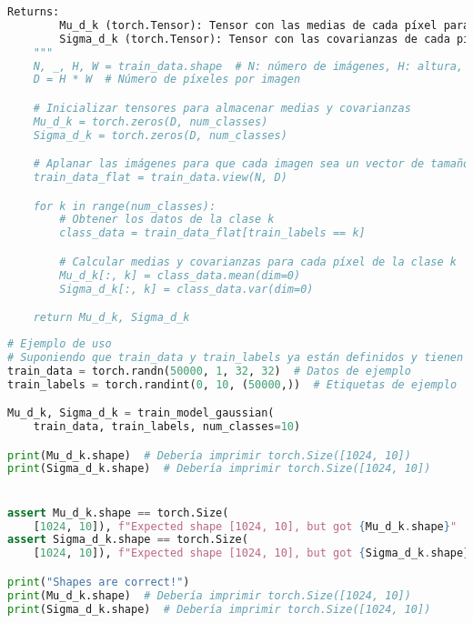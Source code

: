 \documentclass[spanish]{article}
\begin{document}
\begin{enumerate}
\begin{enumerate}
\begin{lstlisting}[language=Python, caption=Implementacion Modelo Gaussiano]
    Returns:
        Mu_d_k (torch.Tensor): Tensor con las medias de cada píxel para cada clase de forma [D, K].
        Sigma_d_k (torch.Tensor): Tensor con las covarianzas de cada píxel para cada clase de forma [D, K].
    """
    N, _, H, W = train_data.shape  # N: número de imágenes, H: altura, W: anchura
    D = H * W  # Número de píxeles por imagen

    # Inicializar tensores para almacenar medias y covarianzas
    Mu_d_k = torch.zeros(D, num_classes)
    Sigma_d_k = torch.zeros(D, num_classes)

    # Aplanar las imágenes para que cada imagen sea un vector de tamaño D
    train_data_flat = train_data.view(N, D)

    for k in range(num_classes):
        # Obtener los datos de la clase k
        class_data = train_data_flat[train_labels == k]

        # Calcular medias y covarianzas para cada píxel de la clase k
        Mu_d_k[:, k] = class_data.mean(dim=0)
        Sigma_d_k[:, k] = class_data.var(dim=0)

    return Mu_d_k, Sigma_d_k
\end{lstlisting}

\begin{lstlisting}[language=Python, caption=Pruebas Unitarias Modelo Gaussiano]
# Ejemplo de uso
# Suponiendo que train_data y train_labels ya están definidos y tienen las dimensiones correctas
train_data = torch.randn(50000, 1, 32, 32)  # Datos de ejemplo
train_labels = torch.randint(0, 10, (50000,))  # Etiquetas de ejemplo

Mu_d_k, Sigma_d_k = train_model_gaussian(
    train_data, train_labels, num_classes=10)

print(Mu_d_k.shape)  # Debería imprimir torch.Size([1024, 10])
print(Sigma_d_k.shape)  # Debería imprimir torch.Size([1024, 10])


assert Mu_d_k.shape == torch.Size(
    [1024, 10]), f"Expected shape [1024, 10], but got {Mu_d_k.shape}"
assert Sigma_d_k.shape == torch.Size(
    [1024, 10]), f"Expected shape [1024, 10], but got {Sigma_d_k.shape}"

print("Shapes are correct!")
print(Mu_d_k.shape)  # Debería imprimir torch.Size([1024, 10])
print(Sigma_d_k.shape)  # Debería imprimir torch.Size([1024, 10])
\end{lstlisting}


\end{enumerate}
\end{enumerate}
\end{document}
